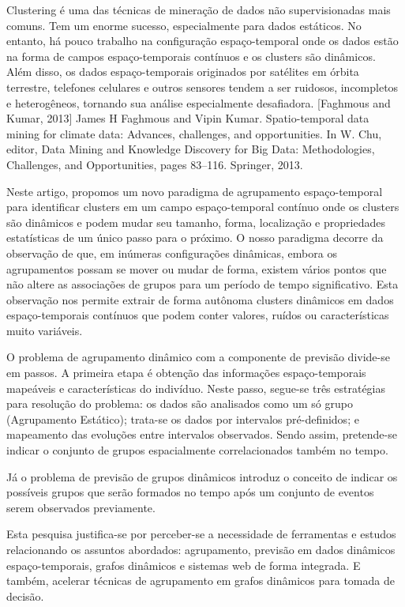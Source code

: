 Clustering é uma das técnicas de mineração de dados não supervisionadas mais comuns. Tem um enorme sucesso, especialmente para dados estáticos. No entanto, há pouco trabalho na configuração espaço-temporal onde os dados estão na forma de campos espaço-temporais contínuos e os clusters são dinâmicos. Além disso, os dados espaço-temporais originados por satélites em órbita terrestre, telefones celulares e outros sensores tendem a ser ruidosos, incompletos e heterogêneos, tornando sua análise especialmente desafiadora.
[Faghmous and Kumar, 2013]
James H Faghmous and Vipin
Kumar. Spatio-temporal data mining for climate data: Advances, challenges, and opportunities. In W. Chu, editor, Data Mining and Knowledge Discovery for Big Data: Methodologies, Challenges, and Opportunities, pages 83–116. Springer, 2013.

Neste artigo, propomos um novo paradigma de agrupamento espaço-temporal para identificar clusters em um campo espaço-temporal contínuo onde os clusters são dinâmicos e podem mudar seu tamanho, forma, localização e propriedades estatísticas de um único passo para o próximo. O nosso paradigma decorre da observação de que, em inúmeras configurações dinâmicas, embora os agrupamentos possam se mover ou mudar de forma, existem vários pontos que não altere as associações de grupos para um período de tempo significativo.
Esta observação nos permite extrair de forma autônoma clusters dinâmicos em dados espaço-temporais contínuos que podem conter valores, ruídos ou características muito variáveis.




O problema de agrupamento dinâmico com a componente de previsão divide-se em passos.
A primeira etapa é obtenção das informações espaço-temporais mapeáveis e características do indivíduo.
Neste passo, segue-se três estratégias para resolução do problema: os dados são analisados
como um só grupo (Agrupamento Estático); trata-se os dados por intervalos pré-definidos; e 
mapeamento das evoluções entre intervalos observados. Sendo assim, pretende-se indicar o conjunto
de grupos espacialmente correlacionados também no tempo.

Já o problema de previsão de grupos dinâmicos introduz o conceito de indicar os
possíveis grupos que serão formados no tempo após um conjunto de eventos serem
observados previamente.

Esta pesquisa justifica-se por perceber-se a necessidade de ferramentas e estudos 
relacionando os assuntos abordados: agrupamento, previsão em dados
dinâmicos espaço-temporais, grafos dinâmicos e sistemas web de forma integrada.
E também, acelerar técnicas de agrupamento em grafos dinâmicos para tomada de decisão.

